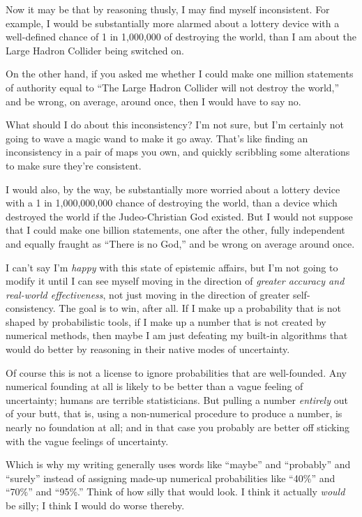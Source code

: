 {
 Now it may be that by reasoning thusly, I may find myself
inconsistent. For example, I would be substantially more alarmed about
a lottery device with a well-defined chance of 1 in 1,000,000 of
destroying the world, than I am about the Large Hadron Collider being
switched on.}

{
 On the other hand, if you asked me whether I could make one
million statements of authority equal to ``The Large
Hadron Collider will not destroy the world,'' and be
wrong, on average, around once, then I would have to say no.}

{
 What should I do about this inconsistency? I'm not
sure, but I'm certainly not going to wave a magic wand
to make it go away. That's like finding an
inconsistency in a pair of maps you own, and quickly scribbling some
alterations to make sure they're consistent.}

{
 I would also, by the way, be substantially more worried about a
lottery device with a 1 in 1,000,000,000 chance of destroying the
world, than a device which destroyed the world if the Judeo-Christian
God existed. But I would not suppose that I could make one billion
statements, one after the other, fully independent and equally fraught
as ``There is no God,'' and be wrong
on average around once.}

{
 I can't say I'm \textit{happy}
with this state of epistemic affairs, but I'm not going
to modify it until I can see myself moving in the direction of
\textit{greater accuracy and real-world effectiveness}, not just moving
in the direction of greater self-consistency. The goal is to win, after
all. If I make up a probability that is not shaped by probabilistic
tools, if I make up a number that is not created by numerical methods,
then maybe I am just defeating my built-in algorithms that would do
better by reasoning in their native modes of uncertainty.}

{
 Of course this is not a license to ignore probabilities that are
well-founded. Any numerical founding at all is likely to be better than
a vague feeling of uncertainty; humans are terrible statisticians. But
pulling a number \textit{entirely} out of your butt, that is, using a
non-numerical procedure to produce a number, is nearly no foundation at
all; and in that case you probably are better off sticking with the
vague feelings of uncertainty.}

{
 Which is why my writing generally uses words like
``maybe'' and
``probably'' and
``surely'' instead of assigning
made-up numerical probabilities like
``40\%'' and
``70\%'' and
``95\%.'' Think of how silly that
would look. I think it actually \textit{would} be silly; I think I
would do worse thereby.}

